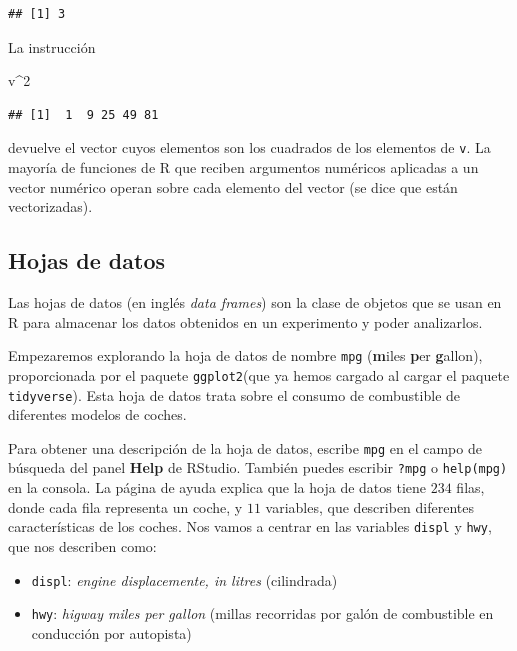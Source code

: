 \documentclass[
  degree=mecinf,
  title=normal,
  toc=normal,
  bib=normal]{mnye}
\providecommand{\tightlist}{%
  \setlength{\itemsep}{0pt}\setlength{\parskip}{0pt}}
\newenvironment{Shaded}{\begin{snugshade}}{\end{snugshade}}
\newcommand{\DecValTok}[1]{\textcolor[rgb]{0.00,0.00,0.81}{#1}}
\newcommand{\NormalTok}[1]{#1}
\newcommand{\SpecialCharTok}[1]{\textcolor[rgb]{0.00,0.00,0.00}{#1}}
\begin{document}
\begin{verbatim}
## [1] 3
\end{verbatim}

La instrucción

\begin{Shaded}
\begin{Highlighting}[]
\NormalTok{v}\SpecialCharTok{\^{}}\DecValTok{2}
\end{Highlighting}
\end{Shaded}

\begin{verbatim}
## [1]  1  9 25 49 81
\end{verbatim}

devuelve el vector cuyos elementos son los cuadrados de los elementos de \texttt{v}.
La mayoría de funciones de \textsf{R} que reciben argumentos numéricos aplicadas a un vector numérico operan sobre cada elemento del vector (se dice que están vectorizadas).

\hypertarget{hojas-de-datos}{%
\subsection{Hojas de datos}\label{hojas-de-datos}}

Las hojas de datos (en inglés \emph{data frames}) son la clase de objetos que se usan en \textsf{R} para almacenar los datos obtenidos en un experimento y poder analizarlos.

Empezaremos explorando la hoja de datos de nombre \texttt{mpg} (\textbf{m}iles \textbf{p}er \textbf{g}allon), proporcionada por el paquete \texttt{ggplot2}(que ya hemos cargado al cargar el paquete \texttt{tidyverse}). Esta hoja de datos trata sobre el consumo de combustible de diferentes modelos de coches.

Para obtener una descripción de la hoja de datos, escribe \texttt{mpg} en el campo de búsqueda del panel \textbf{Help} de \textsf{RStudio}. También puedes escribir \texttt{?mpg} o \texttt{help(mpg)} en la consola. La página de ayuda explica que la hoja de datos tiene \(234\) filas, donde cada fila representa un coche, y \(11\) variables, que describen diferentes características de los coches. Nos vamos a centrar en las variables \texttt{displ} y \texttt{hwy}, que nos describen como:

\begin{itemize}
\tightlist
\item
  \texttt{displ}: \emph{engine displacemente, in litres} (cilindrada)
\item
  \texttt{hwy}: \emph{higway miles per gallon} (millas recorridas por galón de combustible en conducción por autopista)
\end{itemize}
\end{document}
